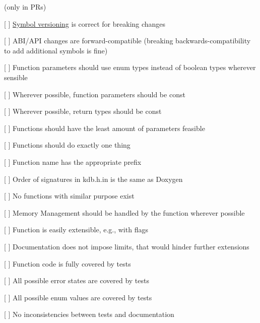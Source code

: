 (only in P\+Rs)


\begin{DoxyItemize}
\item \mbox{[} \mbox{]} \hyperlink{doc_dev_symbol-versioning_md}{Symbol versioning} is correct for breaking changes
\item \mbox{[} \mbox{]} A\+B\+I/\+A\+PI changes are forward-\/compatible (breaking backwards-\/compatibility to add additional symbols is fine)
\end{DoxyItemize}


\begin{DoxyItemize}
\item \mbox{[} \mbox{]} Function parameters should use enum types instead of boolean types wherever sensible
\item \mbox{[} \mbox{]} Wherever possible, function parameters should be {\ttfamily const}
\item \mbox{[} \mbox{]} Wherever possible, return types should be {\ttfamily const}
\item \mbox{[} \mbox{]} Functions should have the least amount of parameters feasible
\end{DoxyItemize}


\begin{DoxyItemize}
\item \mbox{[} \mbox{]} Functions should do exactly one thing
\item \mbox{[} \mbox{]} Function name has the appropriate prefix
\item \mbox{[} \mbox{]} Order of signatures in kdb.\+h.\+in is the same as Doxygen
\item \mbox{[} \mbox{]} No functions with similar purpose exist
\end{DoxyItemize}


\begin{DoxyItemize}
\item \mbox{[} \mbox{]} Memory Management should be handled by the function wherever possible
\end{DoxyItemize}


\begin{DoxyItemize}
\item \mbox{[} \mbox{]} Function is easily extensible, e.\+g., with flags
\item \mbox{[} \mbox{]} Documentation does not impose limits, that would hinder further extensions
\end{DoxyItemize}


\begin{DoxyItemize}
\item \mbox{[} \mbox{]} Function code is fully covered by tests
\item \mbox{[} \mbox{]} All possible error states are covered by tests
\item \mbox{[} \mbox{]} All possible enum values are covered by tests
\item \mbox{[} \mbox{]} No inconsistencies between tests and documentation
\end{DoxyItemize}